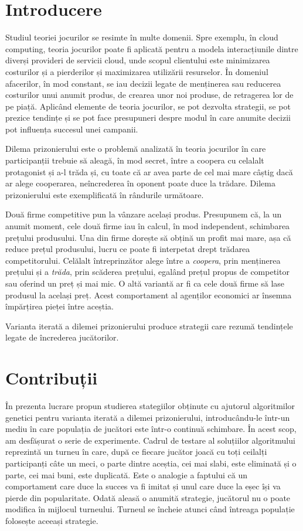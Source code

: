 \chapter*{Introducere}

Studiul teoriei jocurilor se resimte în multe domenii. Spre exemplu, în cloud computing, teoria jocurilor poate fi aplicată pentru a modela interacțiunile dintre diverși provideri de servicii cloud, unde scopul clientului este minimizarea costurilor și a pierderilor și maximizarea utilizării resurselor. În domeniul afacerilor, în mod constant, se iau decizii legate de menținerea sau reducerea costurilor unui anumit produs, de crearea unor noi produse, de retragerea lor de pe piață. Aplicând elemente de teoria jocurilor, se pot dezvolta strategii, se pot prezice tendințe și se pot face presupuneri despre modul în care anumite decizii pot influența succesul unei campanii. 

Dilema prizonierului este o problemă analizată în teoria jocurilor în care participanții trebuie să aleagă, în mod secret, între a coopera cu celalalt protagonist și a-l trăda și, cu toate că ar avea parte de cel mai mare câștig dacă ar alege cooperarea, neîncrederea în oponent poate duce la trădare.  Dilema prizonierului este exemplificată în rândurile următoare. 
 
Două firme competitive pun la vânzare același produs. Presupunem că, la un anumit moment, cele două firme iau în calcul, în mod independent, schimbarea prețului produsului. Una din firme dorește să obțină un profit mai mare, așa că reduce prețul produsului, lucru ce poate fi interpetat drept trădarea competitorului. Celălalt întreprinzător alege între a \textit{coopera}, prin menținerea prețului și a \textit{trăda}, prin scăderea prețului, egalând prețul propus de competitor sau oferind un preț și mai mic. O altă variantă ar fi ca cele două firme să lase produsul la același preț. Acest comportament al agenților economici ar însemna împărțirea pieței între aceștia. 
  
Varianta iterată a dilemei prizonierului produce strategii care rezumă tendințele legate de încrederea jucătorilor.  

\chapter*{Contribuții}

În prezenta lucrare propun studierea stategiilor obținute cu ajutorul algoritmilor genetici pentru varianta iterată a dilemei prizonierului, introducându-le într-un mediu în care populația de jucători este într-o continuă schimbare. În acest scop, am desfășurat o serie de experimente. Cadrul de testare al soluțiilor algoritmului reprezintă un turneu în care, după ce fiecare jucător joacă cu toți ceilalți participanți câte un meci, o parte dintre aceștia, cei mai slabi, este eliminată și o parte, cei mai buni, este duplicată. Este o analogie a faptului că un comportament care duce la succes va fi imitat și unul care duce la eșec își va pierde din popularitate. Odată aleasă o anumită strategie, jucătorul nu o poate modifica în mijlocul turneului. Turneul se încheie atunci când întreaga populație folosește aceeași strategie. 
 
